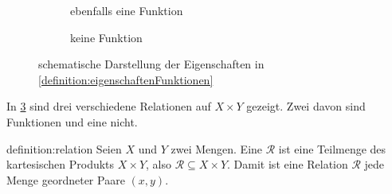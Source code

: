 {\begin{figure}[H]
\begin{subfigure}[b]{0.30\textwidth}
        \caption{ebenfalls eine Funktion}
        \label{subfig:Relation2}
    \end{subfigure}
    \begin{subfigure}[b]{0.30\textwidth}
        \caption{keine Funktion}
        \label{subfig:keineRelation}
    \end{subfigure}%
    \caption{schematische Darstellung der Eigenschaften in \cref{definition:eigenschaftenFunktionen}}
    \label{fig:relationen}
\end{figure}
\noindent
In \cref{fig:relationen} sind drei verschiedene Relationen auf $X\times Y$ gezeigt. Zwei davon sind Funktionen und eine nicht.
}

\begin{definition}[Relation]{definition:relation}
    Seien $X$ und $Y$ zwei Mengen. Eine  $\mathcal{R}$ ist eine Teilmenge des kartesischen Produkts $X\times Y$, also $\mathcal{R}\subseteq X\times Y$. Damit ist eine Relation $\mathcal{R}$ jede Menge geordneter Paare $(x,y)$.
\end{definition}

